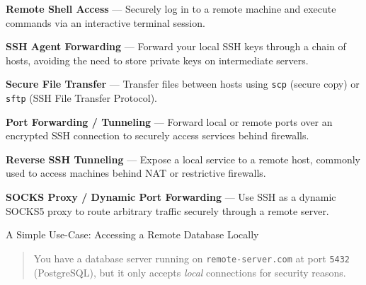 \documentclass[Screen16to9,17pt]{foils}
\begin{document}
\begin{list2}
  \item {\bf Remote Shell Access} --- Securely log in to a remote machine and execute commands via an interactive terminal session.
  \item {\bf SSH Agent Forwarding} --- Forward your local SSH keys through a chain of hosts, avoiding the need to store private keys on intermediate servers.
  \item {\bf Secure File Transfer} --- Transfer files between hosts using \verb+scp+ (secure copy) or \verb+sftp+ (SSH File Transfer Protocol).
  \item {\bf Port Forwarding / Tunneling} --- Forward local or remote ports over an encrypted SSH connection to securely access services behind firewalls.
  \item {\bf Reverse SSH Tunneling} --- Expose a local service to a remote host, commonly used to access machines behind NAT or restrictive firewalls.
  \item {\bf SOCKS Proxy / Dynamic Port Forwarding} --- Use SSH as a dynamic SOCKS5 proxy to route arbitrary traffic securely through a remote server.
\end{list2}



A Simple Use-Case: Accessing a Remote Database Locally

\begin{quote}
You have a database server running on \verb+remote-server.com+ at port \verb+5432+
(PostgreSQL), but it only accepts \emph{local} connections for security reasons.
\end{quote}
\end{document}
